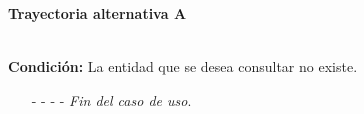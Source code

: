 \hypertarget{CU7-4:TAA}{\textbf{Trayectoria alternativa A}}\\
\noindent \textbf{Condición:} La entidad que se desea consultar no existe.
\begin{enumerate}
	\UCpaso[\UCsist] Muestra la pantalla  con el mensaje .
	\item[- -] - - {\em {Fin del caso de uso}}.
\end{enumerate}